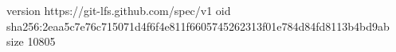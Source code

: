 version https://git-lfs.github.com/spec/v1
oid sha256:2eaa5c7e76c715071d4f6f4e811f6605745262313f01e784d84fd8113b4bd9ab
size 10805
